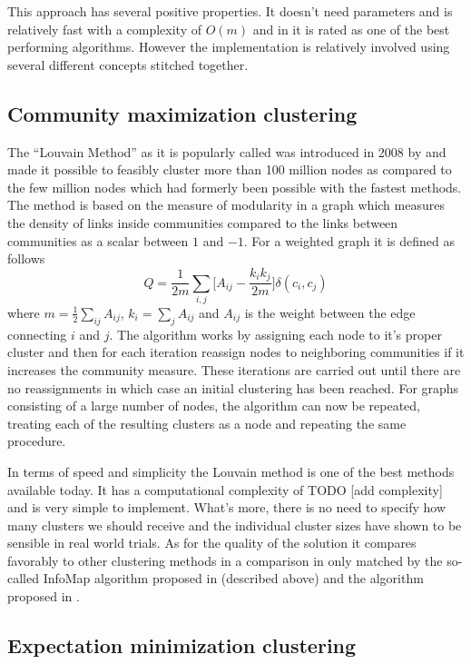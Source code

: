 This approach has several positive properties. It doesn't need 
parameters and is relatively fast with a complexity of $O(m)$ and in 
\cite{lancichinetti2009} it is rated as one of the best performing 
algorithms. However the implementation is relatively involved using 
several different concepts stitched together.

\subsection{Community maximization clustering}
The ``Louvain Method'' as it is popularly called was introduced in 2008 
by \cite{blondel2008} and made it possible to feasibly cluster more than 
100 million nodes as compared to the few million nodes which had 
formerly been possible with the fastest methods. The method is based on 
the measure of modularity in a graph which measures the density of links 
inside communities compared to the links between communities as a scalar 
between $1$ and $-1$\cite{girvan2002}. For a weighted graph it is 
defined as follows
\begin{equation}
	Q = \frac{1}{2m} \sum_{i,j} \lbrack A_{ij} - \frac{k_i k_j}{2m} 
	\rbrack \delta(c_i, c_j)
\end{equation}
where $m=\frac{1}{2} \sum_{ij} A_{ij}$, $k_i = \sum_j A_{ij}$ and 
$A_{ij}$ is the weight between the edge connecting $i$ and $j$. The 
algorithm works by assigning each node to it's proper cluster and then 
for each iteration reassign nodes to neighboring communities if it 
increases the community measure. These iterations are carried out until 
there are no reassignments in which case an initial clustering has been 
reached. For graphs consisting of a large number of nodes, the algorithm 
can now be repeated, treating each of the resulting clusters as a node 
and repeating the same procedure.

In terms of speed and simplicity the Louvain method is one of the best 
methods available today. It has a computational complexity of TODO [add 
complexity] and is very simple to implement. What's more, there is no 
need to specify how many clusters we should receive and the individual 
cluster sizes have shown to be sensible in real world trials. As for the 
quality of the solution it compares favorably to other clustering 
methods in a comparison in \cite{lancichinetti2009} only matched by the 
so-called InfoMap algorithm proposed in \cite{rosvall2008} (described 
above) and the algorithm proposed in \cite{ronhovde2009}.

\subsection{Expectation minimization clustering}
